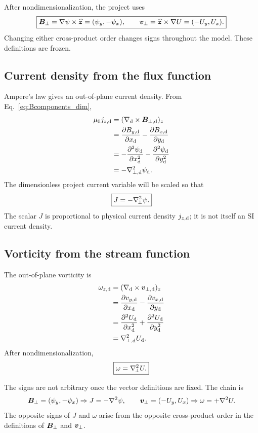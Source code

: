 \begin{conventionbox}
After nondimensionalization, the project uses
\[
\boxed{
\bm{B}_{\perp}=\nabla\psi\times\widehat{\bm{z}}
=(\psi_y,-\psi_x),
\qquad
\bm{v}_{\perp}=\widehat{\bm{z}}\times\nabla U
=(-U_y,U_x).}
\]
Changing either cross-product order changes signs throughout the model. These definitions are frozen.
\end{conventionbox}

\subsection{Current density from the flux function}

Ampere's law gives an out-of-plane current density. From Eq.~\eqref{eq:Bcomponents_dim},
\begin{align}
\mu_0 j_{z,\rm d}
&=(\nabla_{\rm d}\times\bm{B}_{\perp,\rm d})_z\\
&=\frac{\partial B_{y,\rm d}}{\partial x_{\rm d}}
-\frac{\partial B_{x,\rm d}}{\partial y_{\rm d}}\\
&=-\frac{\partial^2\psi_{\rm d}}{\partial x_{\rm d}^2}
-\frac{\partial^2\psi_{\rm d}}{\partial y_{\rm d}^2}\\
&=-\nabla_{\perp,\rm d}^{2}\psi_{\rm d}.
\label{eq:jpsi_dim}
\end{align}
The dimensionless project current variable will be scaled so that
\begin{equation}
\boxed{J=-\nabla_{\!\perp}^{2}\psi.}
\label{eq:Jdef}
\end{equation}
The scalar $J$ is proportional to physical current density $j_{z,\rm d}$; it is not itself an SI current density.

\subsection{Vorticity from the stream function}

The out-of-plane vorticity is
\begin{align}
\omega_{z,\rm d}
&=(\nabla_{\rm d}\times\bm{v}_{\perp,\rm d})_z\\
&=\frac{\partial v_{y,\rm d}}{\partial x_{\rm d}}
-\frac{\partial v_{x,\rm d}}{\partial y_{\rm d}}\\
&=\frac{\partial^2 U_{\rm d}}{\partial x_{\rm d}^2}
+\frac{\partial^2 U_{\rm d}}{\partial y_{\rm d}^2}\\
&=\nabla_{\perp,\rm d}^{2}U_{\rm d}.
\end{align}
After nondimensionalization,
\begin{equation}
\boxed{\omega=\nabla_{\!\perp}^{2} U.}
\label{eq:omegadef}
\end{equation}

\begin{checkpointbox}
The signs are not arbitrary once the vector definitions are fixed. The chain is
\[
\bm{B}_\perp=(\psi_y,-\psi_x)
\Rightarrow J=-\nabla^2\psi,
\qquad
\bm{v}_\perp=(-U_y,U_x)
\Rightarrow\omega=+\nabla^2U.
\]
The opposite signs of $J$ and $\omega$ arise from the opposite cross-product order in the definitions of $\bm{B}_\perp$ and $\bm{v}_\perp$.
\end{checkpointbox}
